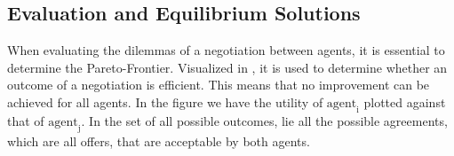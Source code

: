 



\subsection{Evaluation and Equilibrium Solutions}
When evaluating the dilemmas of a negotiation between agents, it is essential to determine the Pareto-Frontier. Visualized in , it is used to determine whether an outcome of a negotiation is efficient. This means that no improvement can be achieved for all agents. In the figure we have the utility of $\text{agent}_\text{i}$ plotted against that of  $\text{agent}_\text{j}$. In the set of all possible outcomes, lie all the possible agreements, which are all offers, that are acceptable by both agents.

